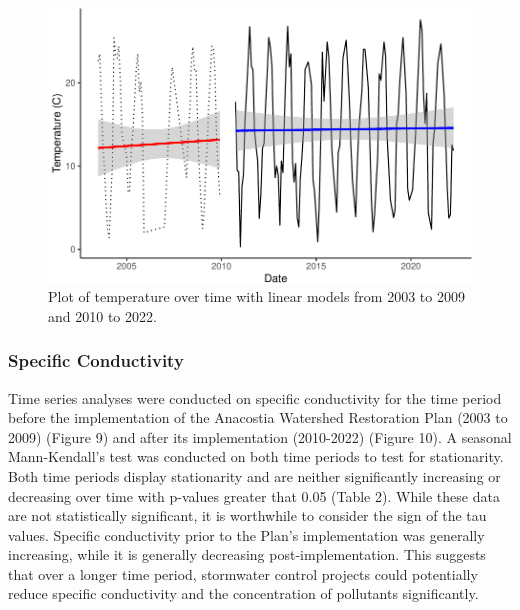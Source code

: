 \documentclass[
  12pt,
]{article}
\begin{document}
\newpage

\begin{figure}

{\centering \includegraphics{Fischer_WDA_FinalProject_files/figure-latex/Plot of Temperature over time with LMs-1} 

}

\caption{Plot of temperature over time with linear models from 2003 to 2009 and 2010 to 2022.}\label{fig:Plot of Temperature over time with LMs}
\end{figure}

\newpage

\hypertarget{specific-conductivity}{%
\subsubsection{Specific Conductivity}\label{specific-conductivity}}

Time series analyses were conducted on specific conductivity for the
time period before the implementation of the Anacostia Watershed
Restoration Plan (2003 to 2009) (Figure 9) and after its implementation
(2010-2022) (Figure 10). A seasonal Mann-Kendall's test was conducted on
both time periods to test for stationarity. Both time periods display
stationarity and are neither significantly increasing or decreasing over
time with p-values greater that 0.05 (Table 2). While these data are not
statistically significant, it is worthwhile to consider the sign of the
tau values. Specific conductivity prior to the Plan's implementation was
generally increasing, while it is generally decreasing
post-implementation. This suggests that over a longer time period,
stormwater control projects could potentially reduce specific
conductivity and the concentration of pollutants significantly.
\end{document}
